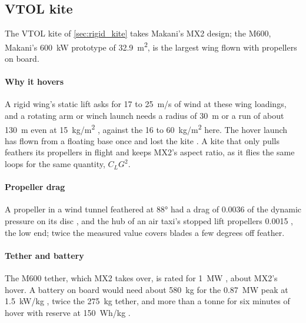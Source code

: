 \subsection{VTOL kite}
\label{sec:det_rigid}

The VTOL kite of \cref{sec:rigid_kite} takes Makani's MX2 design; the M600, Makani's \SI{600}{kW} prototype of \SI{32.9}{m^2}, is the largest wing flown with propellers on board.

\paragraph{Why it hovers} A rigid wing's static lift asks for 17 to \SI{25}{m/s} of wind at these wing loadings, and a rotating arm or winch launch needs a radius of \SI{30}{m} or a run of about \SI{130}{m} even at \SI{15}{kg/m^2} \citep{fagiano2017takeoff}, against the 16 to \SI{60}{kg/m^2} here. The hover launch has flown from a floating base once and lost the kite \citep{echeverri2020part1,echeverri2020part2}. A kite that only pulls feathers its propellers in flight and keeps MX2's aspect ratio, as it flies the same loops for the same quantity, $C_L G^2$.

\paragraph{Propeller drag} A propeller in a wind tunnel feathered at 88° had a drag of 0.0036 of the dynamic pressure on its disc \citep{hartman1933}, and the hub of an air taxi's stopped lift propellers 0.0015 \citep{silva2018}, the low end; twice the measured value covers blades a few degrees off feather.

\paragraph{Tether and battery} The M600 tether, which MX2 takes over, is rated for \SI{1}{MW} \citep{echeverri2020part2}, about MX2's hover. A battery on board would need about \SI{580}{kg} for the \SI{0.87}{MW} peak at 1.5~kW/kg \citep{sripad2021}, twice the \SI{275}{kg} tether, and more than a tonne for six minutes of hover with reserve at 150~Wh/kg \citep{johnson2018}.

